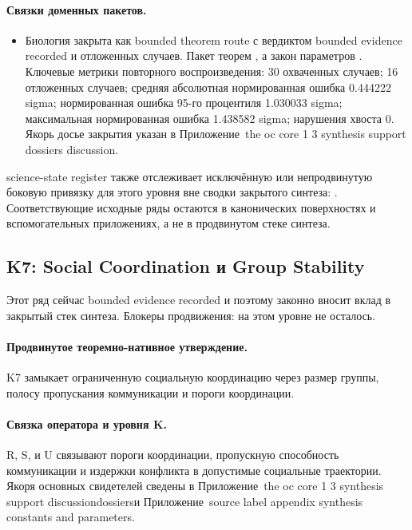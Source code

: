 \paragraph{Связки доменных пакетов.}
\begin{itemize}[leftmargin=1.6em,nosep]
\item Биология закрыта как bounded theorem route с вердиктом bounded evidence recorded и  отложенных случаев. Пакет теорем , а закон параметров . Ключевые метрики повторного воспроизведения: 30 охваченных случаев; 16 отложенных случаев; средняя абсолютная нормированная ошибка 0.444222 sigma; нормированная ошибка 95-го процентиля 1.030033 sigma; максимальная нормированная ошибка 1.438582 sigma; нарушения хвоста 0. Якорь досье закрытия указан в Приложение~the oc core 1 3 synthesis support dossiers discussion.
\end{itemize}
science-state register также отслеживает  исключённую или непродвинутую боковую привязку для этого уровня вне сводки закрытого синтеза: . Соответствующие исходные ряды остаются в канонических поверхностях и вспомогательных приложениях, а не в продвинутом стеке синтеза.

\subsection{K7: Social Coordination и Group Stability}
\label{sec:oc-core-1-3-synthesis-k7}
Этот ряд сейчас bounded evidence recorded и поэтому законно вносит вклад в закрытый стек синтеза.
Блокеры продвижения: на этом уровне не осталось.

\paragraph{Продвинутое теоремно-нативное утверждение.}
K7 замыкает ограниченную социальную координацию через размер группы, полосу пропускания коммуникации и пороги координации.

\paragraph{Связка оператора и уровня K.}
R, S, и U связывают пороги координации, пропускную способность коммуникации и издержки конфликта в допустимые социальные траектории.
Якоря основных свидетелей сведены в Приложение~the oc core 1 3 synthesis support discussiondossiersи Приложение~source label appendix synthesis constants and parameters.

